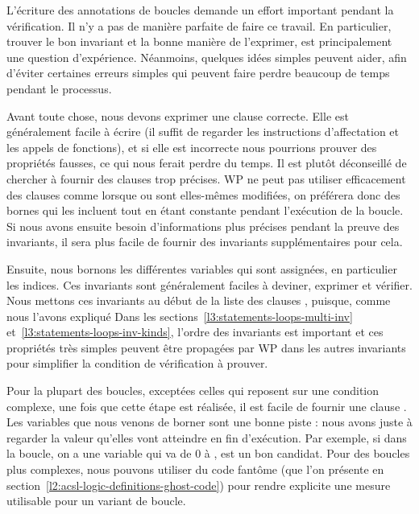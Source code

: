 

L'écriture des annotations de boucles demande un effort important pendant la
vérification. Il n'y a pas de manière parfaite de faire ce travail. En
particulier, trouver le bon invariant et la bonne manière de l'exprimer, est
principalement une question d'expérience. Néanmoins, quelques idées simples
peuvent aider, afin d'éviter certaines erreurs simples qui peuvent faire perdre
beaucoup de temps pendant le processus.


Avant toute chose, nous devons exprimer une clause 
correcte. Elle est généralement facile à écrire (il suffit de regarder les
instructions d'affectation et les appels de fonctions), et si elle est
incorrecte nous pourrions prouver des propriétés fausses, ce qui nous ferait
perdre du temps. Il est plutôt déconseillé de chercher à fournir des clauses
 trop précises. WP ne peut pas utiliser efficacement
des clauses comme  lorsque  ou
 sont elles-mêmes modifiées, on préférera donc des bornes qui
les incluent tout en étant constante pendant l'exécution de la boucle. Si nous
avons ensuite besoin d'informations plus précises pendant la preuve des
invariants, il sera plus facile de fournir des invariants supplémentaires pour
cela.


Ensuite, nous bornons les différentes variables qui sont assignées, en
particulier les indices. Ces invariants sont généralement faciles à deviner,
exprimer et vérifier. Nous mettons ces invariants au début de la liste des
clauses , puisque, comme nous l'avons expliqué
Dans les sections~\ref{l3:statements-loops-multi-inv}
et~\ref{l3:statements-loops-inv-kinds}, l'ordre des invariants est important
et ces propriétés très simples peuvent être propagées par WP dans les autres
invariants pour simplifier la condition de vérification à prouver.


Pour la plupart des boucles, exceptées celles qui reposent sur une condition
complexe, une fois que cette étape est réalisée, il est facile de fournir une
clause . Les variables que nous venons de borner sont
une bonne piste : nous avons juste à regarder la valeur qu'elles vont atteindre
en fin d'exécution. Par exemple, si dans la boucle, on a une variable
 qui va de 0 à ,  est un bon
candidat. Pour des boucles plus complexes, nous pouvons utiliser du code
fantôme (que l'on présente en section~\ref{l2:acsl-logic-definitions-ghost-code})
pour rendre explicite une mesure utilisable pour un variant de boucle.


